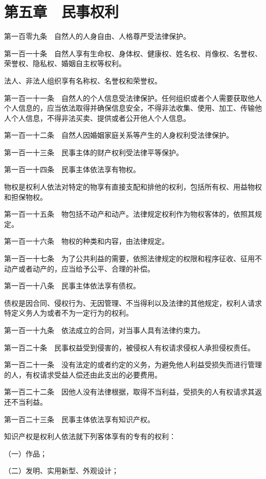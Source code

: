 \documentclass[UTF8,12pt,a4paper]{ctexbook}
\begin{document}
\section*{第五章　民事权利}

第一百零九条　自然人的人身自由、人格尊严受法律保护。

第一百一十条　自然人享有生命权、身体权、健康权、姓名权、肖像权、名誉权、荣誉权、隐私权、婚姻自主权等权利。

法人、非法人组织享有名称权、名誉权和荣誉权。

第一百一十一条　自然人的个人信息受法律保护。任何组织或者个人需要获取他人个人信息的，应当依法取得并确保信息安全，不得非法收集、使用、加工、传输他人个人信息，不得非法买卖、提供或者公开他人个人信息。

第一百一十二条　自然人因婚姻家庭关系等产生的人身权利受法律保护。

第一百一十三条　民事主体的财产权利受法律平等保护。

第一百一十四条　民事主体依法享有物权。

物权是权利人依法对特定的物享有直接支配和排他的权利，包括所有权、用益物权和担保物权。

第一百一十五条　物包括不动产和动产。法律规定权利作为物权客体的，依照其规定。

第一百一十六条　物权的种类和内容，由法律规定。

第一百一十七条　为了公共利益的需要，依照法律规定的权限和程序征收、征用不动产或者动产的，应当给予公平、合理的补偿。

第一百一十八条　民事主体依法享有债权。

债权是因合同、侵权行为、无因管理、不当得利以及法律的其他规定，权利人请求特定义务人为或者不为一定行为的权利。

第一百一十九条　依法成立的合同，对当事人具有法律约束力。

第一百二十条　民事权益受到侵害的，被侵权人有权请求侵权人承担侵权责任。

第一百二十一条　没有法定的或者约定的义务，为避免他人利益受损失而进行管理的人，有权请求受益人偿还由此支出的必要费用。

第一百二十二条　因他人没有法律根据，取得不当利益，受损失的人有权请求其返还不当利益。

第一百二十三条　民事主体依法享有知识产权。

知识产权是权利人依法就下列客体享有的专有的权利：

（一）作品；

（二）发明、实用新型、外观设计；
\end{document}
